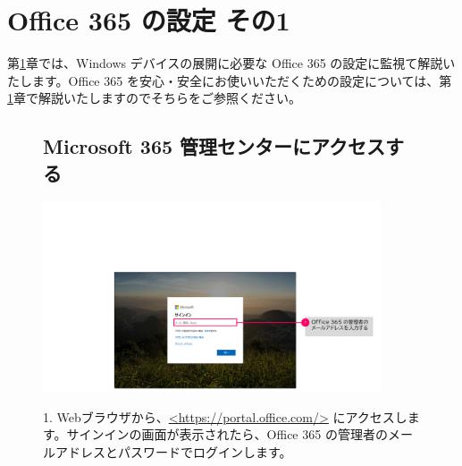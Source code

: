 
\onecolumn
\chapter{Office 365 の設定 その1}
\label{chap:O365設定1}


第\ref{chap:O365設定1}章では、Windows デバイスの展開に必要な Office 365 の設定に監視て解説いたします。Office 365 を安心・安全にお使いいただくための設定については、第\ref{chap:O365設定1}章で解説いたしますのでそちらをご参照ください。
　　
\begin{figure}[htbp]
    \begin{minipage}{1.0\textwidth}
        \section{Microsoft 365 管理センターにアクセスする}
        \label{sec:M365管理センター}
    \end{minipage}
\end{figure}

\begin{figure}[h]
    \begin{minipage}{0.6\textwidth}
        \vspace{-1.5cm}
        \includegraphics[width=10cm]{figures/M365_setting1-00.png}
    \end{minipage}
    \begin{minipage}{0.4\textwidth}
        1. Webブラウザから、\url{<https://portal.office.com/>} にアクセスします。サインインの画面が表示されたら、Office 365 の管理者のメールアドレスとパスワードでログインします。
    \end{minipage}
\end{figure}

